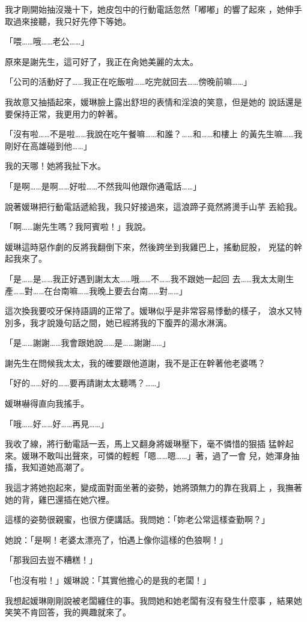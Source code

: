我才剛開始抽沒幾十下，她皮包中的行動電話忽然「嘟嘟」的響了起來
，她伸手取過來接聽，我只好先停下等她。

「喂……哦……老公……」

原來是謝先生，這可好了，我正在肏她美麗的太太。

「公司的活動好了……我正在吃飯啦……吃完就回去……傍晚前嘛……」

我故意又抽插起來，媛琳臉上露出舒坦的表情和淫浪的笑意，但是她的
說話還是要保持正常，我更用力的幹著。

「沒有啦……不是啦……我說在吃午餐嘛……和誰？……和……和樓上
的黃先生嘛……我剛好在高雄碰到他……」

我的天哪！她將我扯下水。

「是啊……是啊……好啦……不然我叫他跟你通電話……」

說著媛琳把行動電話遞給我，我只好接過來，這浪蹄子竟然將燙手山芋
丟給我。

「啊……謝先生嗎？我阿賓啦！」我說。

媛琳這時惡作劇的反將我翻倒下來，然後跨坐到我雞巴上，搖動屁股，
兇猛的幹起我來了。

「是……是……我正好遇到謝太太……哦……不……我不跟她一起回
去……我太太剛生產……對……在台南嘛……我晚上要去台南……對……」

這次換我要咬牙保持語調的正常了。媛琳似乎是非常容易悸動的樣子，
浪水又特別多，我才說幾句話之間，她已經將我的下腹弄的湯水淋漓。

「是……謝謝……我會跟她說……是……謝謝……」

謝先生在問候我太太，我的確要跟他道謝，我不是正在幹著他老婆嗎？

「好的……好的……要再請謝太太聽嗎？……」

媛琳嚇得直向我搖手。

「哦……好……好……再見……」

我收了線，將行動電話一丟，馬上又翻身將媛琳壓下，毫不憐惜的狠插
猛幹起來。媛琳不敢叫出聲來，可憐的輕輕「嗯……嗯……」著，過了一會
兒，她渾身抽搐，我知道她高潮了。

我這才將她抱起來，變成面對面坐著的姿勢，她將頭無力的靠在我肩上
，我撫著她的背，雞巴還插在她穴裡。

這樣的姿勢很親蜜，也很方便講話。我問她：「妳老公常這樣查勤啊？」

她說：「是啊！老婆太漂亮了，怕遇上像你這樣的色狼啊！」

「那我回去豈不糟糕！」

「也沒有啦！」媛琳說：「其實他擔心的是我的老闆！」

我想起媛琳剛剛說被老闆纏住的事。我問她和她老闆有沒有發生什麼事
，結果她笑笑不肯回答，我的興趣就來了。

